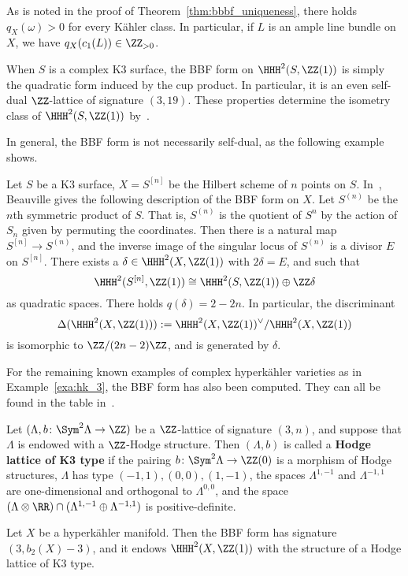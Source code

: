 \begin{remark}\label{rk:positive_on_amples}
As is noted in the proof of Theorem~\ref{thm:bbbf_uniqueness}, there holds $q_X(\omega) > 0$ for every K\"ahler class. In particular, if $L$ is an ample line bundle on $X$, we have $q_X(c_1(L)) \in \ZZ_{> 0}$.
\end{remark}

\begin{example}\label{exa:bbf_k3}
When $S$ is a complex K3 surface, the BBF form on $\HHH^2(S,\ZZ(1))$ is simply the quadratic form induced by the cup product. In particular, it is an even self-dual $\ZZ$-lattice of signature $(3,19)$. These properties determine the isometry class of $\HHH^2(S,\ZZ(1))$ by~\cite[Chapter~V, Theorem~5]{SerreCourse}.
\end{example}

In general, the BBF form is not necessarily self-dual, as the following example shows.

\begin{example}\label{exa:bbf_k3n}
Let $S$ be a K3 surface, $X = S^{[n]}$ be the Hilbert scheme of $n$ points on $S$. In~\cite{Beauville}, Beauville gives the following description of the BBF form on $X$. Let $S^{(n)}$ be the $n$th symmetric product of $S$. That is, $S^{(n)}$ is the quotient of $S^n$ by the action of $S_n$ given by permuting the coordinates. Then there is a natural map $S^{[n]} \rightarrow S^{(n)}$, and the inverse image of the singular locus of $S^{(n)}$ is a divisor $E$ on $S^{[n]}$. There exists a $\delta \in \HHH^2(X,\ZZ(1))$ with $2 \delta = E$, and such that
$$
\HHH^2(S^{[n]},\ZZ(1)) \cong \HHH^2(S,\ZZ(1)) \oplus \ZZ\delta
$$
as quadratic spaces. There holds $q(\delta) = 2 - 2n$. In particular, the discriminant 
$$
\Delta(\HHH^2(X,\ZZ(1))) := \HHH^2(X,\ZZ(1))^{\vee}/\HHH^2(X,\ZZ(1))
$$
is isomorphic to $\ZZ/(2n - 2)\ZZ$, and is generated by $\delta$.
\end{example}

\begin{example}
For the remaining known examples of complex hyperk\"ahler varieties as in Example~\ref{exa:hk_3}, the BBF form has also been computed. They can all be found in the table in~\cite{Rapagnetta}.
\end{example}

Let $(\Lambda,b\colon \Sym^2 \Lambda \rightarrow \ZZ)$ be a $\ZZ$-lattice of signature $(3,n)$, and suppose that $\Lambda$ is endowed with a $\ZZ$-Hodge structure. Then $(\Lambda,b)$ is called a {\bfseries Hodge lattice of K3 type} if the pairing $b\colon \Sym^2 \Lambda \rightarrow \ZZ(0)$ is a morphism of Hodge structures, $\Lambda$ has type $(-1,1),(0,0),(1,-1)$, the spaces $\Lambda^{1,-1}$ and $\Lambda^{-1,1}$ are one-dimensional and orthogonal to $\Lambda^{0,0}$, and the space $(\Lambda \otimes \RR) \cap (\Lambda^{1,-1} \oplus \Lambda^{-1,1})$ is positive-definite.
\begin{proposition}\label{prop:bbf_k3_type}
    Let $X$ be a hyperk\"ahler manifold. Then the BBF form has signature $(3,b_2(X)-3)$, and it endows $\HHH^2(X,\ZZ(1))$ with the structure of a Hodge lattice of K3 type.
\end{proposition}

